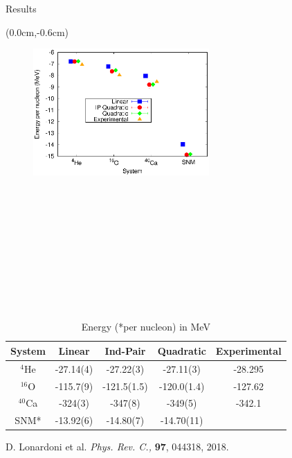 \documentclass{beamer}
\begin{document}
\begin{frame}{Results}
\begin{textblock*}{\textwidth}(0.0cm,-0.6cm) %
\begin{figure}[h]
   \centering
   \includegraphics[width=0.6\textwidth]{energy.eps}
\end{figure}
\end{textblock*}
~\\~\\~\\~\\~\\~\\~\\~\\~\\
\tiny
\begin{table}[htb]
\centering
\caption*[]{Energy (*per nucleon) in MeV}
\begin{tabular}{ccccc}
\hline\hline
System & Linear & Ind-Pair & Quadratic & Experimental\\
\hline
${}^{4}${He}   & -27.14(4) & -27.22(3)    & -27.11(3)    & -28.295   \\
${}^{16}${O}   & -115.7(9) & -121.5(1.5)  & -120.0(1.4)  & -127.62   \\
${}^{40}${Ca}  & -324(3)   & -347(8)      & -349(5)      & -342.1     \\
SNM*           & -13.92(6) & -14.80(7)    & -14.70(11)   &           \\
\hline\hline
\end{tabular}
\label{tab:psi2}
\end{table}
{\tiny D. Lonardoni et al. \textit{Phys. Rev. C.,} \textbf{97}, 044318, 2018.}
\end{frame}
\end{document}
